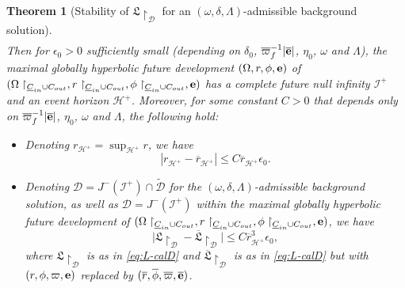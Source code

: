 \documentclass[10pt, reqno]{amsart}
\newtheorem{theorem}{Theorem}[section]
\theoremstyle{definition}
\theoremstyle{remark}
\theoremstyle{conjecture}
\numberwithin{equation}{section}
\newcommand{\abs}[1]{\vert#1\vert}
\newcommand{\0}{\emptyset}
\newcommand{\dlt}{\delta}
\newcommand{\eps}{\epsilon}
\newcommand{\Lmb}{\Lambda}
\newcommand{\omg}{\omega}
\newcommand{\Omg}{\Omega}
\newcommand{\bfe}{{\bf e}}
\newcommand{\calD}{\mathcal D}
\newcommand{\calH}{\mathcal H}
\newcommand{\calI}{\mathcal I}
\newcommand{\uC}{\underline{C}}
\newcommand{\de}{\delta}
\newcommand{\EH}{\calH^{+}}
\newcommand{\e}{\bfe}							%
\newcommand{\NI}{\calI^{+}}						%
\newcommand{\phibg}{\overline{\phi}}				%
\newcommand{\rbg}{\overline{r}}					%
\newcommand{\varpibg}{\overline{\varpi}}				%
\newcommand{\ebg}{\overline{\e}}					%
\newcommand{\Abs}[1]{\left\vert #1 \right\vert}
\begin{document}
\begin{theorem} [Stability of $\mathfrak{L} \restriction_{\calD}$ for an $(\omg, \dlt, \Lmb)$-admissible background solution]
\begin{align}
\end{align}
Then for $\eps_{0} > 0$ sufficiently small (depending on $\dlt_{0}$, $\varpibg_{f}^{-1} \abs{\ebg}$, $\eta_{0}$, $\omg$ and $\Lmb$), the maximal globally hyperbolic future development $(\Omg, r, \phi, \e)$ of $(\Omg \restriction_{\uC_{in} \cup C_{out}}, r \restriction_{\uC_{in} \cup C_{out}}, \phi \restriction_{\uC_{in} \cup C_{out}}, \e)$ has a complete future null infinity $\NI$ and an event horizon $\EH$. Moreover, for some constant $C > 0$ that depends only on $\varpibg_{f}^{-1} \abs{\ebg}$, $\eta_{0}$, $\omg$ and $\Lmb$, the following hold:
\begin{itemize}
\item Denoting $r_{\EH}=\sup_{\EH} r$, we have
\begin{equation}\label{eq:L-st-ch:r}
\Abs{r_{\EH} - \rbg_{\EH}} \leq  C \rbg_{\EH} \eps_{0}.
\end{equation}
\item Denoting $\calD=J^-(\NI)\cap \widetilde{\calD}$ for the $(\omg,\de,\Lmb)$-admissible background solution, as well as $\calD=J^-(\NI)$ within the maximal globally hyperbolic future development of $(\Omg \restriction_{\uC_{in} \cup C_{out}}, r \restriction_{\uC_{in} \cup C_{out}}, \phi \restriction_{\uC_{in} \cup C_{out}}, \e)$, we have
\begin{equation}\label{eq:L-st-ch:L}
	\abs{\mathfrak{L} \restriction_{\calD} - \overline{\mathfrak{L}} \restriction_{\calD}} \leq  C \rbg_{\EH}^{3} \eps_{0},	
\end{equation}
where $\mathfrak{L} \restriction_{\calD}$ is as in \eqref{eq:L-calD} and $\overline{\mathfrak{L}} \restriction_{\calD}$ is as in \eqref{eq:L-calD} but with $(r,\phi,\varpi,\e)$ replaced by $(\rbg, \phibg, \varpibg, \ebg)$.
\end{itemize}

\end{theorem}
\end{document}
